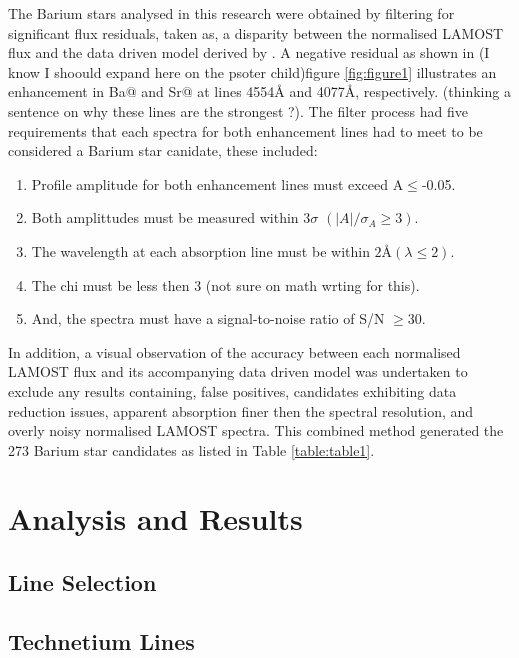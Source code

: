 \documentclass[a4paper,fleqn,usenatbib]{mnras}
\makeatletter
\newcommand{\Rmnum}[1]{\expandafter\@slowromancap\romannumeral #1@}
\makeatother
\begin{document}
The Barium stars analysed in this research were obtained by filtering for significant flux residuals, taken as, a disparity between the normalised LAMOST flux and the data driven model derived by \citet{ho2017}. A negative residual as shown in (I know I shoould expand here on the psoter child)figure \ref{fig:figure1} illustrates an enhancement in Ba\Rmnum{2} and Sr\Rmnum{2} at lines 4554\AA \hspace{0.2mm} and 4077\AA, respectively. (thinking a sentence on why these lines are the strongest ?). The filter process had five requirements that each spectra for both enhancement lines had to meet to be considered a Barium star canidate, these included:

\renewcommand\labelenumi{(\roman{enumi})}
\renewcommand\theenumi\labelenumi

\begin{enumerate} 
\item Profile amplitude for both enhancement lines must exceed A$\leq$-0.05.
\item Both amplittudes must be measured within 3$\sigma$ $(|A|/\sigma _A \geq 3)$.
\item The wavelength at each absorption line must be within $2$\AA \hspace{0.2mm}$(\lambda \leq 2)$.
\item The chi must be less then 3 (not sure on math wrting for this).
\item And, the spectra must have a signal-to-noise ratio of S/N $\geq 30$.
\end{enumerate}
In addition, a visual observation of the accuracy between each normalised LAMOST flux and its accompanying data driven model was undertaken to exclude any results containing, false positives, candidates exhibiting data reduction issues, apparent absorption finer then the spectral resolution, and overly noisy normalised LAMOST spectra. This combined method generated the 273 Barium star candidates as listed in Table \ref{table:table1}. 


\section{Analysis and Results}

\subsection{Line Selection}
\subsection{Technetium Lines}
\end{document}
